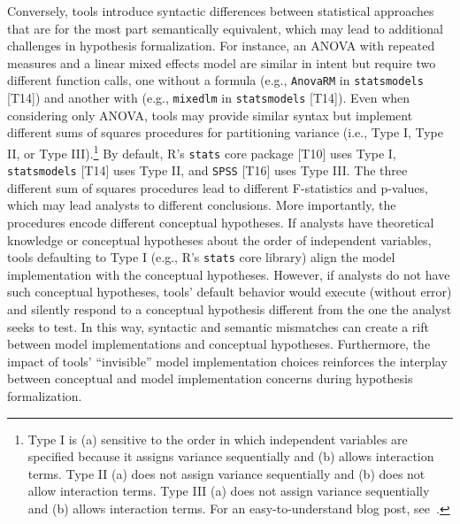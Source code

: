 Conversely, tools introduce syntactic differences between statistical approaches
that are for the most part semantically equivalent, which may lead to additional
challenges in hypothesis formalization. For instance, an ANOVA with repeated
measures and a linear mixed effects model are similar in intent but require two
different function calls, one without a formula (e.g., \texttt{AnovaRM} in
\texttt{statsmodels} [T14]) and another with (e.g., \texttt{mixedlm} in
\texttt{statsmodels} [T14]). Even when considering only ANOVA, tools may provide
similar syntax but implement different sums of squares procedures for
partitioning variance (i.e., Type I, Type II, or Type III).\footnote{Type I is
(a) sensitive to the order in which independent variables are specified because
it assigns variance sequentially and (b) allows interaction terms. Type II (a)
does not assign variance sequentially and (b) does not allow interaction terms.
Type III (a) does not assign variance sequentially and (b) allows interaction
terms. For an easy-to-understand blog post, see~\cite{sumsofsquaresBlog}.} By
default, R's \texttt{stats} core package [T10] uses Type I, \texttt{statsmodels}
[T14] uses Type II, and \texttt{SPSS} [T16] uses Type III. The three different
sum of squares procedures lead to different F-statistics and p-values, which may
lead analysts to different conclusions. More importantly, the procedures encode
different conceptual hypotheses. If analysts have theoretical knowledge or
conceptual hypotheses about the order of independent variables, tools defaulting
to Type I (e.g., R's \texttt{stats} core library) align the model implementation
with the conceptual hypotheses. However, if analysts do not have such conceptual
hypotheses, tools' default behavior would execute (without error) and silently
respond to a conceptual hypothesis different from the one the analyst seeks to
test. In this way, syntactic and semantic mismatches can create a rift between
model implementations and conceptual hypotheses. Furthermore, the impact of tools' ``invisible'' model implementation choices
reinforces the interplay between conceptual and model implementation concerns
during hypothesis formalization. 


\begin{comment}
Tools should highlight the conceptual
assumptions and consequences of modeling choices beyond listing ways to change
defaults in their documentation manuals or Q\&A sites. Doing this would give
analysts more control over and insight into their analysis. Analysts could
revise and refine their hypotheses in response to statistical modeling
constraints or change the statistical models and tools they use to address their
hypotheses. 
\end{comment}

